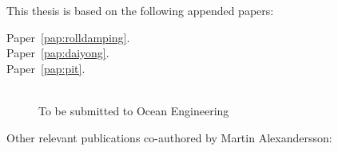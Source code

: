 

This thesis is based on the following appended papers:

\begin{description}
\item[Paper~\ref{pap:rolldamping}.]


\item[Paper~\ref{pap:daiyong}.] 

\item[Paper~\ref{pap:pit}.] 
\\
To be submitted to Ocean Engineering

\end{description}

\vspace{1cm}

\noindent Other relevant publications co-authored by Martin Alexandersson:
\begin{description}
\normalsize
\newcommand{\ME}{{\bfseries Martin Alexandersson}}

\item
{}

\item
{}

\item
{}

\end{description}

